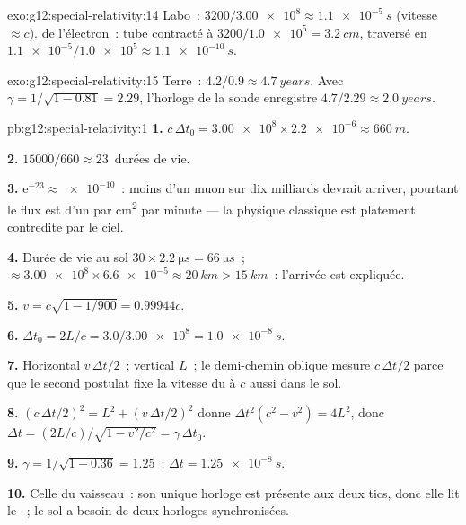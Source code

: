 \begin{solution}{exo:g12:special-relativity:14}
Labo~: $3200/\num{3.00e8} \approx \qty{1.1e-5}{s}$ (vitesse
$\approx c$).  de l'électron~: tube contracté à
$3200/\num{1.0e5} = \qty{3.2}{cm}$, traversé en
$\num{1.1e-5}/\num{1.0e5} \approx \qty{1.1e-10}{s}$.
\end{solution}

\begin{solution}{exo:g12:special-relativity:15}
Terre~: $4.2/0.9 \approx \qty{4.7}{years}$. Avec
$\gamma = 1/\sqrt{1 - 0.81} = 2.29$, l'horloge de la sonde enregistre
$4.7/2.29 \approx \qty{2.0}{years}$.
\end{solution}

\begin{solution}{pb:g12:special-relativity:1}
\textbf{1.} $c\,\Delta t_0 = \num{3.00e8} \times \num{2.2e-6} \approx
\qty{660}{m}$.

\textbf{2.} $\num{15000}/660 \approx 23$~durées de vie.

\textbf{3.} $\mathrm{e}^{-23} \approx \num{e-10}$~: moins d'un muon
sur dix milliards devrait arriver, pourtant le flux est d'un par
\unit{cm^2} par minute --- la physique classique est platement
contredite par le ciel.

\textbf{4.} Durée de vie au sol $30 \times \qty{2.2}{\micro s} =
\qty{66}{\micro s}$~;  $\approx
\num{3.00e8} \times \num{6.6e-5} \approx \qty{20}{km} > \qty{15}{km}$~:
l'arrivée est expliquée.

\textbf{5.} $v = c\sqrt{1 - 1/900} = 0.99944c$.

\textbf{6.} $\Delta t_0 = 2L/c = 3.0/\num{3.00e8} = \qty{1.0e-8}{s}$.

\textbf{7.} Horizontal $v\,\Delta t/2$~; vertical $L$~; le demi-chemin
oblique mesure $c\,\Delta t/2$ parce que le second postulat fixe la
vitesse du  à $c$ aussi dans le
 sol.

\textbf{8.} $(c\,\Delta t/2)^2 = L^2 + (v\,\Delta t/2)^2$ donne
$\Delta t^2(c^2 - v^2) = 4L^2$, donc $\Delta t =
(2L/c)/\sqrt{1 - v^2/c^2} = \gamma\,\Delta t_0$.

\textbf{9.} $\gamma = 1/\sqrt{1 - 0.36} = 1.25$~;
$\Delta t = \qty{1.25e-8}{s}$.

\textbf{10.} Celle du vaisseau~: son unique horloge est présente aux
deux tics, donc elle lit le ~; le
sol a besoin de deux horloges synchronisées.


\end{solution}
